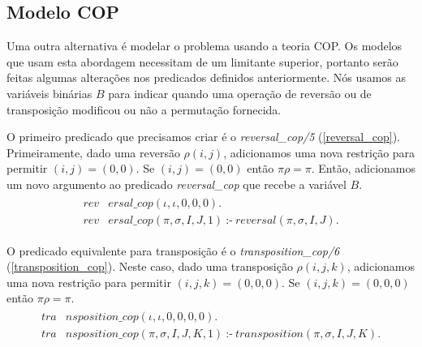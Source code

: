 \subsection{Modelo COP}
\label{subsec:modelcop}
Uma outra alternativa é modelar o problema usando a teoria COP. Os
modelos que usam esta abordagem necessitam de um limitante superior,
portanto serão feitas algumas alterações nos predicados definidos
anteriormente. Nós usamos as variáveis binárias $B$ para indicar
quando uma operação de reversão ou de transposição modificou ou não a
permutação fornecida.

O primeiro predicado que precisamos criar é o \textit{reversal\_cop/5}
(\ref{reversal_cop}). Primeiramente, dado uma reversão $\rho(i, j)$,
adicionamos uma nova restrição para permitir $(i, j) = (0, 0)$. Se
$(i, j) = (0, 0)$ então $\pi\rho = \pi$. Então, adicionamos um novo
argumento ao predicado \textit{reversal\_cop} que recebe a variável
$B$.
\begin{align}
  \label{reversal_cop}
  \begin{split}
  \textit{rev}&\textit{ersal\_cop}(\iota, \iota, 0, 0, 0). \\
  \textit{rev}&\textit{ersal\_cop}(\pi, \sigma, I, J, 1)~\text{:-}~ 
  \textit{reversal}(\pi, \sigma, I, J).
  \end{split}
\end{align}

O predicado equivalente para transposição é
o \textit{transposition\_cop/6} (\ref{transposition_cop}). Neste caso,
dado uma transposição $\rho(i, j, k)$, adicionamos uma nova restrição
para permitir $(i, j, k) = (0, 0, 0)$. Se $(i, j, k) = (0, 0, 0)$
então $\pi\rho = \pi$.
\begin{align}
  \label{transposition_cop}
  \begin{split}
  \textit{tra}&\textit{nsposition\_cop}(\iota, \iota, 0, 0, 0, 0). \\
  \textit{tra}&\textit{nsposition\_cop}(\pi, \sigma, I, J, K, 1)~\text{:-}~ 
  \textit{transposition}(\pi, \sigma, I, J, K). 
  \end{split}
\end{align}

